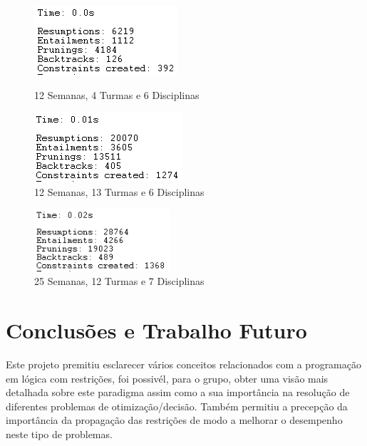 \documentclass{llncs}
\begin{document}
\begin{figure}
\centering
    \begin{minipage}{0.45\textwidth}
    \centering
    \includegraphics[width=.9\textwidth]{12Semanas_4Turmas_6Disciplinas}
    \caption{12 Semanas, 4 Turmas e 6 Disciplinas}
    \end{minipage}\hfill
    \begin{minipage}{0.45\textwidth}
    \centering
   \includegraphics[width=.9\textwidth]{12Semanas_13Turmas_6Disciplinas}
\caption{12 Semanas, 13 Turmas e 6 Disciplinas}
    \end{minipage}\hfill
\end{figure}
\FloatBarrier

\begin{figure}
\centering
\includegraphics[width=0.45\textwidth]{25Semanas_12Turmas_7Disciplinas}
\caption{25 Semanas, 12 Turmas e 7 Disciplinas}
\end{figure}
\FloatBarrier

\section{Conclusões e Trabalho Futuro}
Este projeto premitiu esclarecer vários conceitos relacionados com a programação em lógica com restrições, foi possivél, para o grupo, obter uma visão mais detalhada sobre este paradigma assim como a sua importância na resolução de diferentes problemas de otimização/decisão. Também permitiu a precepção da importância da propagação das restrições de modo a melhorar o desempenho neste tipo de problemas.
\end{document}
